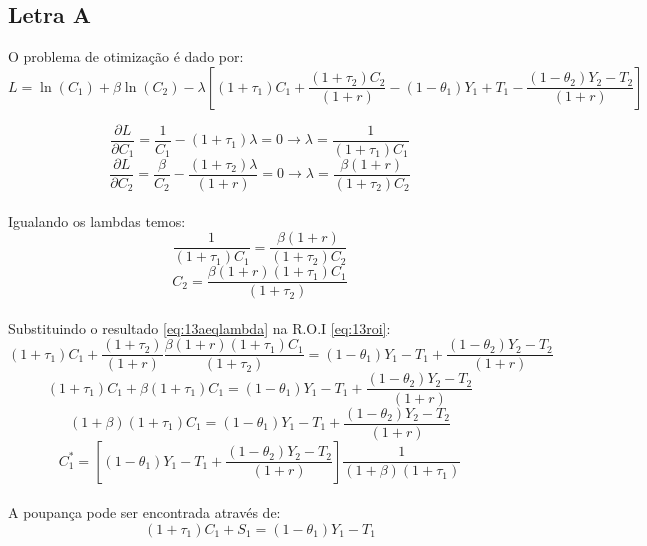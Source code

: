 \documentclass{article}
\begin{document}
\subsection*{Letra A}
O problema de otimização é dado por:
\begin{equation}
    L = \ln(C_1)+\beta\ln(C_2)-\lambda\left[(1+\tau_1)C_1+\frac{(1+\tau_2)C_2}{(1+r)}-(1-\theta_1)Y_1+T_1-\frac{(1-\theta_2)Y_2-T_2}{(1+r)}\right]
\end{equation}

\begin{equation}
    \frac{\partial L}{\partial C_1}=\frac{1}{C_1}-(1+\tau_1)\lambda=0 \to \lambda=\frac{1}{(1+\tau_1)C_1}
\end{equation}
\begin{equation}
    \frac{\partial L}{\partial C_2}=\frac{\beta}{C_2}-\frac{(1+\tau_2)\lambda}{(1+r)}=0 \to \lambda=\frac{\beta(1+r)}{(1+\tau_2)C_2}
\end{equation}
\\
Igualando os lambdas temos:
\begin{equation}
    \frac{1}{(1+\tau_1)C_1}=\frac{\beta(1+r)}{(1+\tau_2)C_2}
\end{equation}
\begin{equation}\label{eq:13aeqlambda}
    C_2=\frac{\beta(1+r)(1+\tau_1)C_1}{(1+\tau_2)}
\end{equation}
\\
Substituindo o resultado \eqref{eq:13aeqlambda} na R.O.I \eqref{eq:13roi}:
\begin{equation}
    (1+\tau_1)C_1+\frac{(1+\tau_2)}{(1+r)}\frac{\beta(1+r)(1+\tau_1)C_1}{(1+\tau_2)}=(1-\theta_1)Y_1-T_1+\frac{(1-\theta_2)Y_2-T_2}{(1+r)}
\end{equation}
\begin{equation}
    (1+\tau_1)C_1+\beta(1+\tau_1)C_1=(1-\theta_1)Y_1-T_1+\frac{(1-\theta_2)Y_2-T_2}{(1+r)}
\end{equation}
\begin{equation}
    (1+\beta)(1+\tau_1)C_1=(1-\theta_1)Y_1-T_1+\frac{(1-\theta_2)Y_2-T_2}{(1+r)}
\end{equation}
\begin{equation}\label{eq:13ac1star}
    C_1^*=\left[(1-\theta_1)Y_1-T_1+\frac{(1-\theta_2)Y_2-T_2}{(1+r)}\right]\frac{1}{(1+\beta)(1+\tau_1)}
\end{equation}
\\
A poupança pode ser encontrada através de:
\begin{equation}
    (1+\tau_1)C_1+S_1=(1-\theta_1)Y_1-T_1
\end{equation}
\end{document}
